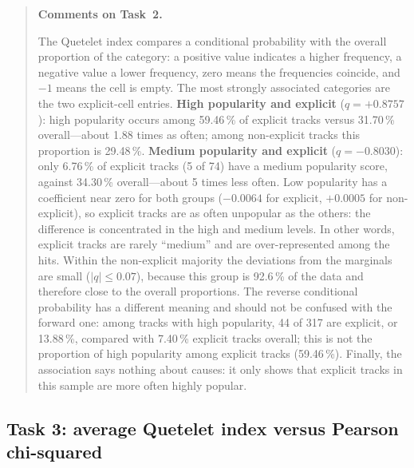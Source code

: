 \documentclass[11pt,letterpaper]{article}
\newenvironment{taskcomments}[1][Comments]{%
  \par\medskip\noindent
  \begin{quote}\small\textbf{#1.}\enspace\ignorespaces
}{%
  \end{quote}\medskip
}
\begin{document}
\begin{taskcomments}[Comments on Task~2]
The Quetelet index compares a conditional probability with the overall
proportion of the category: a positive value indicates a higher frequency, a
negative value a lower frequency, zero means the frequencies coincide, and
$-1$ means the cell is empty. The most strongly associated categories are the
two explicit-cell entries. \textbf{High popularity and explicit} ($q =
+0.8757$): high popularity occurs among 59.46\,\% of explicit tracks versus
31.70\,\% overall---about 1.88 times as often; among non-explicit tracks this
proportion is 29.48\,\%. \textbf{Medium popularity and explicit} ($q =
-0.8030$): only 6.76\,\% of explicit tracks (5 of 74) have a medium
popularity score, against 34.30\,\% overall---about 5 times less often. Low
popularity has a coefficient near zero for both groups ($-0.0064$ for
explicit, $+0.0005$ for non-explicit), so explicit tracks are as often
unpopular as the others: the difference is concentrated in the high and
medium levels. In other words, explicit tracks are rarely ``medium'' and are
over-represented among the hits. Within the non-explicit majority the
deviations from the marginals are small ($|q|\le 0.07$), because this group
is 92.6\,\% of the data and therefore close to the overall proportions. The
reverse conditional probability has a different meaning and should not be
confused with the forward one: among tracks with high popularity, 44 of 317
are explicit, or 13.88\,\%, compared with 7.40\,\% explicit tracks overall;
this is not the proportion of high popularity among explicit tracks
(59.46\,\%). Finally, the association says nothing about causes: it only
shows that explicit tracks in this sample are more often highly popular.
\end{taskcomments}

\subsection{Task 3: average Quetelet index versus Pearson chi-squared}\label{sec:a4t3}
\end{document}
